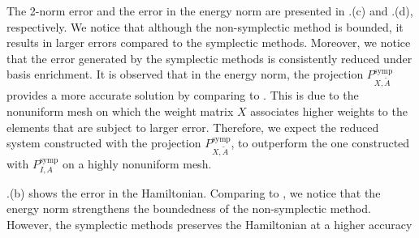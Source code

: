 The 2-norm error and the error in the energy norm are presented in .(c) and .(d), respectively. We notice that although the non-symplectic method is bounded, it results in larger errors compared to the symplectic methods. Moreover, we notice that the error generated by the symplectic methods is consistently reduced under basis enrichment. It is observed that in the energy norm, the projection $P_{X,\tilde A}^{\text{symp}}$ provides a more accurate solution by comparing to . This is due to the nonuniform mesh on which the weight matrix $X$ associates higher weights to the elements that are subject to larger error. Therefore, we expect the reduced system constructed with the projection $P_{X,\tilde A}^{\text{symp}}$, to outperform the one constructed with $P_{I,A}^{\text{symp}}$ on a highly nonuniform mesh.

.(b) shows the error in the Hamiltonian. Comparing to , we notice that the energy norm strengthens the boundedness of the non-symplectic method. However, the symplectic methods preserves the Hamiltonian at a higher accuracy


